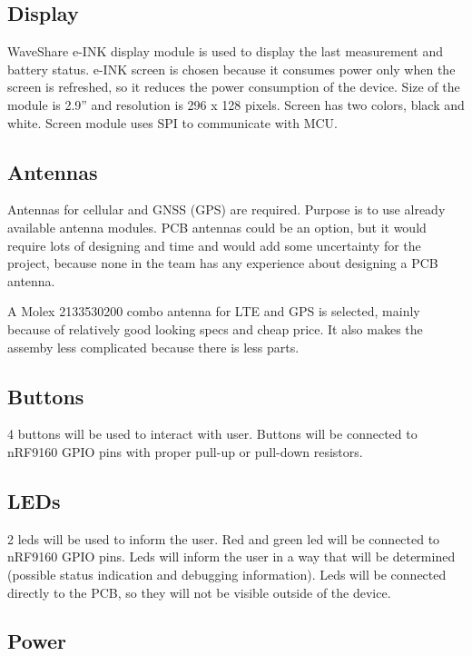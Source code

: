 \documentclass[]{dithesis}
\begin{document}
\subsection{Display}

WaveShare e-INK display module is used to display the last measurement and battery status. e-INK screen is chosen because it consumes power only when the screen is refreshed, so it reduces the power consumption of the device. Size of the module is 2.9” and resolution is 296 x 128 pixels. Screen has two colors, black and white. Screen module uses SPI to communicate with MCU.  

\subsection{Antennas}

Antennas for cellular and GNSS (GPS) are required. Purpose is to use already available antenna modules. PCB antennas could be an option, but it would require lots of designing and time and would add some uncertainty for the project, because none in the team has any experience about designing a PCB antenna. 

A Molex 2133530200 combo antenna for LTE and GPS is selected, mainly because of relatively good looking specs and cheap price. It also makes the assemby less complicated because there is less parts.

\subsection{Buttons}

4 buttons will be used to interact with user. Buttons will be connected to nRF9160 GPIO pins with proper pull-up or pull-down resistors. 

\subsection{LEDs}

2 leds will be used to inform the user. Red and green led will be connected to nRF9160 GPIO pins. Leds will inform the user in a way that will be determined (possible status indication and debugging information). Leds will be connected directly to the PCB, so they will not be visible outside of the device. 

\subsection{Power}
\end{document}
